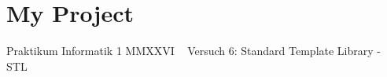 \chapter{My Project}
\hypertarget{index}{}\label{index}
Praktikum Informatik 1 MMXXVI ~\newline
 Versuch 6\+: Standard Template Library -\/ STL 